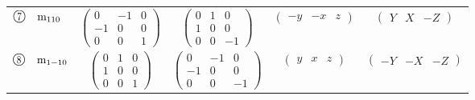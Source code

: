 \documentclass[fleqn,10pt,landscape]{jsarticle}
\begin{document}
\begin{center}
\begin{longtable}{lcccc}
$ {\ooalign{\hfil\resizebox{.8\width}{\height}{7}\hfil\crcr\raise.1ex\hbox{\large$\bigcirc$}}}\quad {\rm m}_{110} $ & $ \begin{pmatrix} 0 & -1 & 0 \\ -1 & 0 & 0 \\ 0 & 0 & 1 \end{pmatrix} $ & $ \begin{pmatrix} 0 & 1 & 0 \\ 1 & 0 & 0 \\ 0 & 0 & -1 \end{pmatrix} $ & $ \begin{pmatrix} - y & - x & z \end{pmatrix} $ & $ \begin{pmatrix} Y & X & - Z \end{pmatrix} $ \\
$ {\ooalign{\hfil\resizebox{.8\width}{\height}{8}\hfil\crcr\raise.1ex\hbox{\large$\bigcirc$}}}\quad {\rm m}_{1-10} $ & $ \begin{pmatrix} 0 & 1 & 0 \\ 1 & 0 & 0 \\ 0 & 0 & 1 \end{pmatrix} $ & $ \begin{pmatrix} 0 & -1 & 0 \\ -1 & 0 & 0 \\ 0 & 0 & -1 \end{pmatrix} $ & $ \begin{pmatrix} y & x & z \end{pmatrix} $ & $ \begin{pmatrix} - Y & - X & - Z \end{pmatrix} $ \\
\end{longtable}
\end{center}
\newpage
\end{document}
